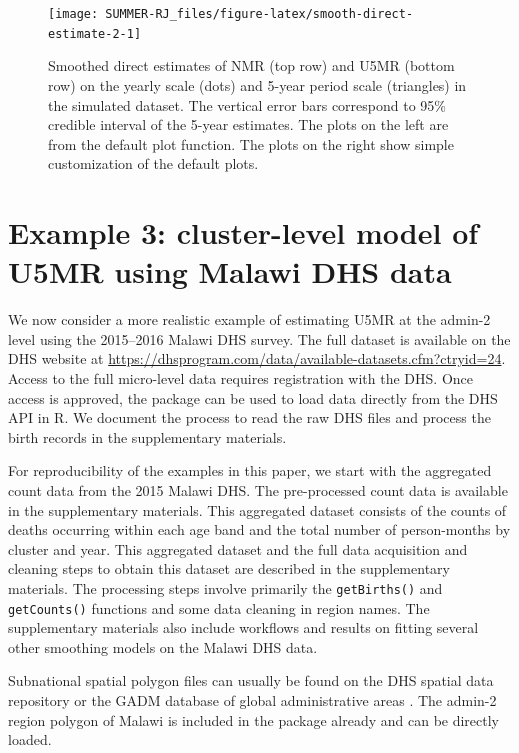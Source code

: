 \begin{figure}[!ht]
\texttt{[image: SUMMER-RJ\_files/figure-latex/smooth-direct-estimate-2-1]} \caption{Smoothed direct estimates of NMR (top row) and U5MR (bottom row) on the yearly scale (dots) and 5-year period scale (triangles) in the simulated dataset. The vertical error bars correspond to 95\% credible interval of the 5-year estimates. The plots on the left are from the default plot function. The plots on the right show simple customization of the default plots.}\label{fig:smooth-direct-estimate-2}
\end{figure}

\section{Example 3: cluster-level model of U5MR using Malawi DHS data}\label{example-3-cluster-level-model-of-u5mr-using-malawi-dhs-data}

We now consider a more realistic example of estimating U5MR at the admin-2 level using the 2015--2016 Malawi DHS survey. The full dataset is available on the DHS website at \url{https://dhsprogram.com/data/available-datasets.cfm?ctryid=24}. Access to the full micro-level data requires registration with the DHS. Once access is approved, the  \citep{rdhs} package can be used to load data directly from the DHS API in R. We document the process to read the raw DHS files and process the birth records in the supplementary materials.

For reproducibility of the examples in this paper, we start with the aggregated count data from the 2015 Malawi DHS. The pre-processed count data is available in the supplementary materials. This aggregated dataset consists of the counts of deaths occurring within each age band and the total number of person-months by cluster and year. This aggregated dataset and the full data acquisition and cleaning steps to obtain this dataset are described in the supplementary materials. The processing steps involve primarily the \texttt{getBirths()} and \texttt{getCounts()} functions and some data cleaning in region names. The supplementary materials also include workflows and results on fitting several other smoothing models on the Malawi DHS data.

Subnational spatial polygon files can usually be found on the DHS spatial data repository \citep{dhsspatial} or the GADM database of global administrative areas \citep{areas2012gadm}. The admin-2 region polygon of Malawi is included in the  package already and can be directly loaded.


